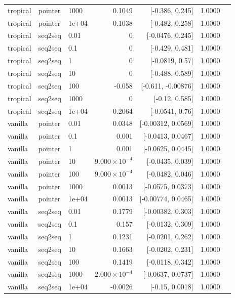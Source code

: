 \documentclass[10pt]{article}
\begin{document}
{\begin{longtable}{lllrrrl}
tropical & pointer & 1000 & 0.1049 & [-0.386, 0.245] & 1.0000 & \\
tropical & pointer & 1e+04 & 0.1038 & [-0.482, 0.258] & 1.0000 & \\
tropical & seq2seq & 0.01 & 0 & [-0.0476, 0.245] & 1.0000 & \\
tropical & seq2seq & 0.1 & 0 & [-0.429, 0.481] & 1.0000 & \\
tropical & seq2seq & 1 & 0 & [-0.0819, 0.57] & 1.0000 & \\
tropical & seq2seq & 10 & 0 & [-0.488, 0.589] & 1.0000 & \\
tropical & seq2seq & 100 & -0.058 & [-0.611, -0.00876] & 1.0000 & \\
tropical & seq2seq & 1000 & 0 & [-0.12, 0.585] & 1.0000 & \\
tropical & seq2seq & 1e+04 & 0.2064 & [-0.0541, 0.76] & 1.0000 & \\
vanilla & pointer & 0.01 & 0.0348 & [-0.00312, 0.0569] & 1.0000 & \\
vanilla & pointer & 0.1 & 0.001 & [-0.0413, 0.0467] & 1.0000 & \\
vanilla & pointer & 1 & 0.001 & [-0.0625, 0.0445] & 1.0000 & \\
vanilla & pointer & 10 & $9.000\times10^{-4}$ & [-0.0435, 0.039] & 1.0000 & \\
vanilla & pointer & 100 & $9.000\times10^{-4}$ & [-0.0482, 0.046] & 1.0000 & \\
vanilla & pointer & 1000 & 0.0013 & [-0.0575, 0.0373] & 1.0000 & \\
vanilla & pointer & 1e+04 & 0.0013 & [-0.00774, 0.0465] & 1.0000 & \\
vanilla & seq2seq & 0.01 & 0.1779 & [-0.00382, 0.303] & 1.0000 & \\
vanilla & seq2seq & 0.1 & 0.157 & [-0.0132, 0.309] & 1.0000 & \\
vanilla & seq2seq & 1 & 0.1231 & [-0.0201, 0.262] & 1.0000 & \\
vanilla & seq2seq & 10 & 0.1663 & [-0.0202, 0.231] & 1.0000 & \\
vanilla & seq2seq & 100 & 0.1419 & [-0.0118, 0.342] & 1.0000 & \\
vanilla & seq2seq & 1000 & $2.000\times10^{-4}$ & [-0.0637, 0.0737] & 1.0000 & \\
vanilla & seq2seq & 1e+04 & -0.0026 & [-0.15, 0.0018] & 1.0000 & \\
\bottomrule
\end{longtable}
}
\end{document}
